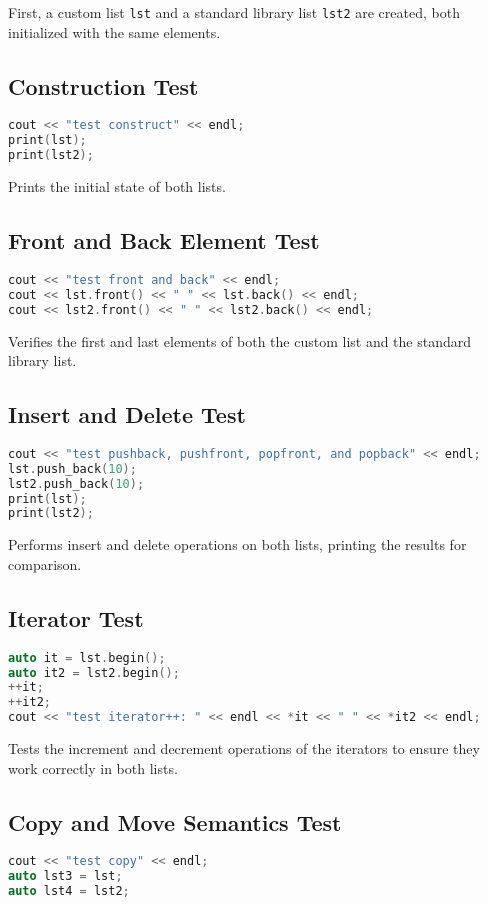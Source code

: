 \documentclass{article}
\begin{document}
First, a custom list \texttt{lst} and a standard library list \texttt{lst2} are created, both initialized with the same elements.

\subsection{Construction Test}
\begin{lstlisting}[language=C++]
cout << "test construct" << endl;
print(lst);
print(lst2);
\end{lstlisting}

Prints the initial state of both lists.

\subsection{Front and Back Element Test}
\begin{lstlisting}[language=C++]
cout << "test front and back" << endl;
cout << lst.front() << " " << lst.back() << endl;
cout << lst2.front() << " " << lst2.back() << endl;
\end{lstlisting}

Verifies the first and last elements of both the custom list and the standard library list.

\subsection{Insert and Delete Test}
\begin{lstlisting}[language=C++]
cout << "test pushback, pushfront, popfront, and popback" << endl;
lst.push_back(10);
lst2.push_back(10);
print(lst);
print(lst2);
\end{lstlisting}

Performs insert and delete operations on both lists, printing the results for comparison.

\subsection{Iterator Test}
\begin{lstlisting}[language=C++]
auto it = lst.begin();
auto it2 = lst2.begin();
++it;
++it2;
cout << "test iterator++: " << endl << *it << " " << *it2 << endl;
\end{lstlisting}

Tests the increment and decrement operations of the iterators to ensure they work correctly in both lists.

\subsection{Copy and Move Semantics Test}
\begin{lstlisting}[language=C++]
cout << "test copy" << endl;
auto lst3 = lst;
auto lst4 = lst2;
\end{lstlisting}
\end{document}
